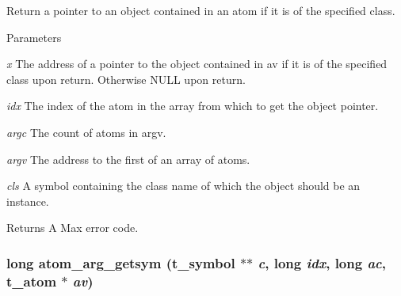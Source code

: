 Return a pointer to an object contained in an atom if it is of the specified class. 
\begin{DoxyParams}{Parameters}
\item[{\em x}]The address of a pointer to the object contained in av if it is of the specified class upon return. Otherwise NULL upon return. \item[{\em idx}]The index of the atom in the array from which to get the object pointer. \item[{\em argc}]The count of atoms in argv. \item[{\em argv}]The address to the first of an array of atoms. \item[{\em cls}]A symbol containing the class name of which the object should be an instance. \end{DoxyParams}
\begin{DoxyReturn}{Returns}
A Max error code. 
\end{DoxyReturn}
\hypertarget{group__atom_gaeba7a400021327a46673220ef1c1ee98}{
\subsubsection[{atom\_\-arg\_\-getsym}]{\setlength{\rightskip}{0pt plus 5cm}long atom\_\-arg\_\-getsym ({\bf t\_\-symbol} $\ast$$\ast$ {\em c}, \/  long {\em idx}, \/  long {\em ac}, \/  {\bf t\_\-atom} $\ast$ {\em av})}}
\label{group__atom_gaeba7a400021327a46673220ef1c1ee98}


